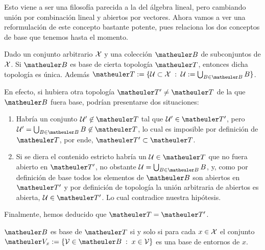 Esto viene a ser una filosofía parecida a la del álgebra lineal, pero cambiando unión por combinación lineal y abiertos por vectores. Ahora vamos a ver una reformulación de este concepto bastante potente, pues relaciona los dos conceptos de base que tenemos hasta el momento.
\begin{obs}
	Dado un conjunto arbitrario $\mathcal{X}$ y una colección $\B$ de subconjuntos de $\mathcal{X}$. Si $\B$ es base de cierta topología $\T$, entonces dicha topología es única. Además $\T:=\{\U\subset\X\midc\U:=\bigcup_{B\in\B}B\}$.
	
	En efecto, si hubiera otra topología $\T'\not=\T$ de la que $\B$ fuera base, podrían presentarse dos situaciones:
	\begin{enumerate}
		\item Habría un conjunto $\U'\not\in\T$ tal que $\U'\in\T'$, pero $\U'=\bigcup_{B\in\B}B\not\in\T$, lo cual es imposible por definición de $\T$, por ende, $\T'\subset \T$.
		\item Si se diera el contenido estricto habría un $\U\in\T$ que no fuera abierto en $\T'$, no obstante $\U=\bigcup_{B\in\B}B$, y, como por definición de base todos los elementos de $\B$ son abiertos en $\T'$ y por definición de topología la unión arbitraria de abiertos es abierta, $\U\in\T'$. Lo cual contradice nuestra hipótesis.
	\end{enumerate}
	Finalmente, hemos deducido que $\T=\T'$.
\end{obs}
\begin{prop}
	\label{etop_prop_caracterizacionBases}
	$\B$ es base de $\T$ si y solo si para cada $x \in \mathcal{X}$ el conjunto
	$\Va{x} := \{ \V \in \B \midc  x \in \V\}$ es una base de entornos de $x$.
\end{prop}
